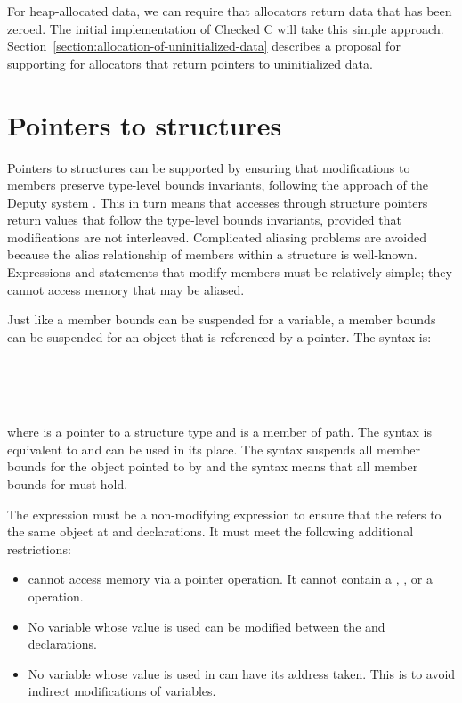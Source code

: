 For heap-allocated data, we can require that allocators
return data that has been zeroed.  The initial implementation of
Checked C will take this simple approach.  Section~\ref{section:allocation-of-uninitialized-data} 
describes a proposal for supporting for allocators that return pointers to
uninitialized data.
 
\section{Pointers to structures}

Pointers to  structures can be supported by ensuring that modifications to members
preserve type-level bounds invariants, following the approach of the Deputy
system \cite{Condit2007}.  This in turn means that accesses through structure
pointers return values that  follow the type-level bounds invariants, provided that modifications
are not interleaved.  Complicated aliasing problems are avoided because the
alias relationship of members within a structure is well-known.  Expressions
and statements that modify members must be relatively simple; they cannot access memory
that may be aliased.

Just like a member bounds can be suspended for a variable, a member bounds can 
be suspended for an object that is referenced by a pointer. The syntax is:

\begin{tabbing}
\= \\
\>\code{->}\code{)} \\
\>\code{->}\code{)} \\
\end{tabbing}

where  is a pointer to a structure type  and  is a member of
path.  The syntax \code{(*} is equivalent to 
\code{->} and can be used in its place.  
The syntax \code{)} suspends all member bounds for 
the object pointed to by  and the syntax \code{)} 
means that all member bounds for  must hold.

The expression  must be a non-modifying expression to ensure that the 
refers to the same object at  and  declarations.
It must meet the following additional restrictions:
\begin{itemize}
\item {} cannot access memory via a pointer operation.
      It cannot contain a \code{*}, \code{->},  or a \code{[]} operation.
\item No variable whose value is used  can be modified between the 
and  declarations.
\item No variable whose value is used in  can have its address taken. 
This is to avoid indirect modifications of variables.
\end{itemize}

